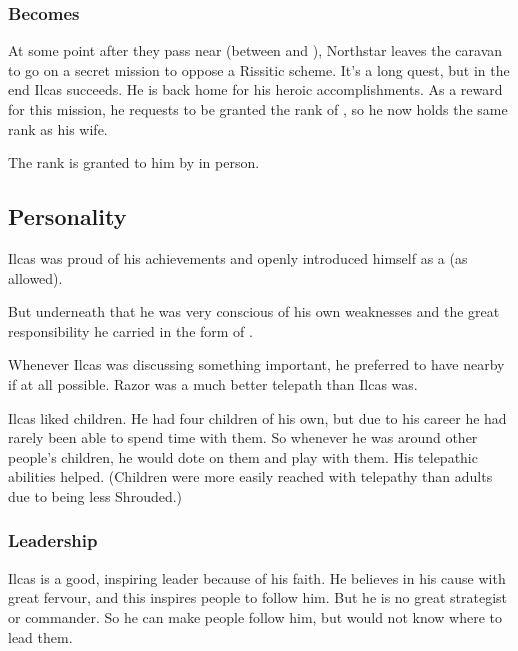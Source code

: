 \subsubsection{Becomes \Retaxis}
\index{\Retaxis}
At some point after they pass near \Redglen{} (between  and ), Northstar leaves the caravan to go on a secret mission to oppose a Rissitic scheme. 
It's a long quest, but in the end Ilcas succeeds. 
He is \honoured back home for his heroic accomplishments.
As a reward for this mission, he requests to be granted the \honorary rank of \Retaxis, so he now holds the same rank as his wife. 

The rank is granted to him by \Sarokash in person. 









\subsection{Personality}
Ilcas was proud of his achievements and openly introduced himself as a  (as  allowed). 

But underneath that he was very conscious of his own weaknesses and the great responsibility he carried in the form of . 

Whenever Ilcas was discussing something important, he preferred to have  nearby if at all possible. 
Razor was a much better telepath than Ilcas was. 

Ilcas liked children. 
He had four children of his own, but due to his career he had rarely been able to spend time with them. 
So whenever he was around other people's children, he would dote on them and play with them. 
His telepathic abilities helped. 
(Children were more easily reached with telepathy than adults due to being less Shrouded.)





\subsubsection{Leadership}
Ilcas is a good, inspiring leader because of his faith. 
He believes in his cause with great fervour, and this inspires people to follow him.
But he is no great strategist or commander. 
So he can make people follow him, but would not know where to lead them. 





